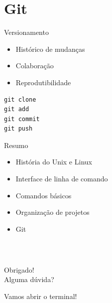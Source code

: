 \documentclass[xcolor=dvipsnames,t,aspectratio=169]{beamer}
\newcommand{\highlight}[1]{{\color{nes_dark_orange} #1}}
\begin{document}
\section{Git}

\begin{frame}[c, fragile]{Versionamento}

\begin{display}

\begin{itemize}

\item Histórico de mudanças

\item Colaboração

\item Reprodutibilidade

\end{itemize}

\end{display}

\begin{verbatim}
git clone
git add
git commit
git push
\end{verbatim}

\end{frame}

\begin{frame}[c]{Resumo}

\begin{display}

\begin{itemize}

\item História do Unix e Linux

\item Interface de linha de comando

\item Comandos básicos

\item Organização de projetos

\item Git

\end{itemize}

\end{display}

\end{frame}


\begin{frame}
    \frametitle{~}
        \vfill
        \begin{center}
            {\Huge Obrigado!}\vspace{1.5em}\\
            {\Large \highlight{Alguma dúvida?}}\\
        \end{center}
        \vfill
        \begin{center}
            {\small Vamos abrir o terminal!}
        \end{center}
\end{frame}
\end{document}
